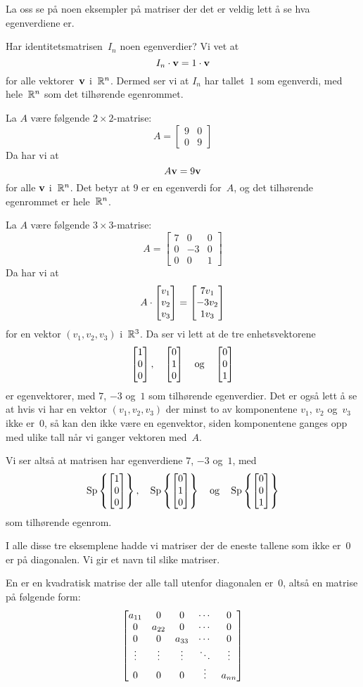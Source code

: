 La oss se på noen eksempler på matriser der det er veldig lett å se
hva egenverdiene er.

\begin{ex}
Har identitetsmatrisen~$I_n$ noen egenverdier?  Vi vet at
\[
I_n \cdot \mathbf{v} = 1 \cdot \mathbf{v}
\]
for alle vektorer~$\mathbf{v}$ i~$\mathbb{R}^n$.  Dermed ser vi at $I_n$ har
tallet~$1$ som egenverdi, med hele~$\mathbb{R}^n$ som det tilhørende
egenrommet.
\end{ex}

\begin{ex}
La $A$ være følgende $2 \times 2$-matrise:
\[
A =
\begin{bmatrix}
9 & 0 \\
0 & 9
\end{bmatrix}
\]
Da har vi at
\[
A \mathbf{v} = 9 \mathbf{v}
\]
for alle $\mathbf{v}$ i~$\mathbb{R}^n$.  Det betyr at $9$ er en egenverdi for~$A$,
og det tilhørende egenrommet er hele~$\mathbb{R}^n$.
\end{ex}

\begin{ex}
La $A$ være følgende $3 \times 3$-matrise:
\[
A =
\begin{bmatrix}
7 &  0 & 0 \\
0 & -3 & 0 \\
0 &  0 & 1
\end{bmatrix}
\]
Da har vi at
\[
A \cdot \begin{bmatrix} v_1 \\ v_2 \\ v_3 \end{bmatrix} = \begin{bmatrix} 7v_1 \\ -3v_2 \\ 1v_3 \end{bmatrix}
\]
for en vektor $(v_1,v_2,v_3)$ i~$\mathbb{R}^3$.  Da ser vi lett at de tre
enhetsvektorene
\[
\begin{bmatrix} 1 \\ 0 \\ 0 \end{bmatrix},\quad
\begin{bmatrix} 0 \\ 1 \\ 0 \end{bmatrix}\quad\text{og}\quad
\begin{bmatrix} 0 \\ 0 \\ 1 \end{bmatrix}
\]
er egenvektorer, med $7$, $-3$ og~$1$ som tilhørende egenverdier.  Det
er også lett å se at hvis vi har en vektor $(v_1,v_2,v_3)$ der minst
to av komponentene $v_1$, $v_2$ og~$v_3$ ikke er~$0$, så kan den ikke
være en egenvektor, siden komponentene ganges opp med ulike tall når
vi ganger vektoren med~$A$.

Vi ser altså at matrisen har egenverdiene $7$, $-3$ og~$1$, med
\[
\operatorname{Sp} \left\{ \begin{bmatrix} 1 \\ 0 \\ 0 \end{bmatrix} \right\},\quad
\operatorname{Sp} \left\{ \begin{bmatrix} 0 \\ 1 \\ 0 \end{bmatrix} \right\}\quad\text{og}\quad
\operatorname{Sp} \left\{ \begin{bmatrix} 0 \\ 0 \\ 1 \end{bmatrix} \right\}
\]
som tilhørende egenrom.
\end{ex}

I alle disse tre eksemplene hadde vi matriser der de eneste tallene
som ikke er~$0$ er på diagonalen.  Vi gir et navn til slike matriser.

\begin{defn}
En  er en kvadratisk matrise der alle tall
utenfor diagonalen er~$0$, altså en matrise på følgende form:
\[
\begin{bmatrix}
a_{11} & 0      & 0      & \cdots & 0      \\
0      & a_{22} & 0      & \cdots & 0      \\
0      & 0      & a_{33} & \cdots & 0      \\
\vdots & \vdots & \vdots & \ddots & \vdots \\
0      & 0      & 0      & \vdots & a_{nn}
\end{bmatrix}
\vspace{-17pt}
\]
\end{defn}

